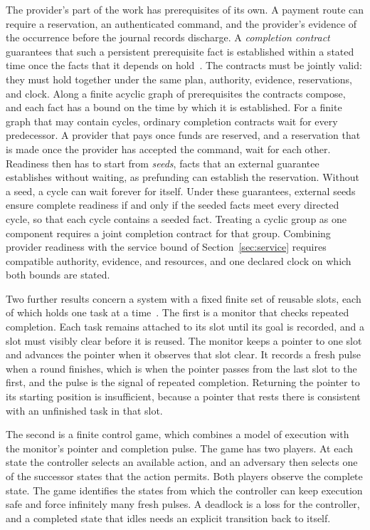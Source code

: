 \documentclass{momentum}
\begin{document}
The provider's part of the work has prerequisites of its own. A payment route can require a reservation, an authenticated command, and the provider's evidence of the occurrence before the journal records discharge. A \emph{completion contract} guarantees that such a persistent prerequisite fact is established within a stated time once the facts that it depends on hold~\cite[Section~6]{claim}. The contracts must be jointly valid: they must hold together under the same plan, authority, evidence, reservations, and clock. Along a finite acyclic graph of prerequisites the contracts compose, and each fact has a bound on the time by which it is established. For a finite graph that may contain cycles, ordinary completion contracts wait for every predecessor. A provider that pays once funds are reserved, and a reservation that is made once the provider has accepted the command, wait for each other. Readiness then has to start from \emph{seeds}, facts that an external guarantee establishes without waiting, as prefunding can establish the reservation. Without a seed, a cycle can wait forever for itself. Under these guarantees, external seeds ensure complete readiness if and only if the seeded facts meet every directed cycle, so that each cycle contains a seeded fact. Treating a cyclic group as one component requires a joint completion contract for that group. Combining provider readiness with the service bound of Section~\ref{sec:service} requires compatible authority, evidence, and resources, and one declared clock on which both bounds are stated.

Two further results concern a system with a fixed finite set of reusable slots, each of which holds one task at a time~\cite[Propositions~7.16 and~7.17]{aot}. The first is a monitor that checks repeated completion. Each task remains attached to its slot until its goal is recorded, and a slot must visibly clear before it is reused. The monitor keeps a pointer to one slot and advances the pointer when it observes that slot clear. It records a fresh pulse when a round finishes, which is when the pointer passes from the last slot to the first, and the pulse is the signal of repeated completion. Returning the pointer to its starting position is insufficient, because a pointer that rests there is consistent with an unfinished task in that slot.

The second is a finite control game, which combines a model of execution with the monitor's pointer and completion pulse. The game has two players. At each state the controller selects an available action, and an adversary then selects one of the successor states that the action permits. Both players observe the complete state. The game identifies the states from which the controller can keep execution safe and force infinitely many fresh pulses. A deadlock is a loss for the controller, and a completed state that idles needs an explicit transition back to itself.
\end{document}
